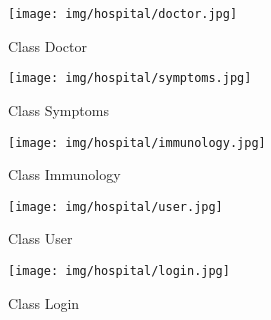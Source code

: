 \begin{figure}[!h]
\centering
\texttt{[image: img/hospital/doctor.jpg]}
\caption{Class Doctor}
\label{fig:hospitalDoctor}
\end{figure}




\begin{figure}[!h]
\centering
\texttt{[image: img/hospital/symptoms.jpg]}
\caption{Class Symptoms}
\label{fig:hospitalSymptoms}
\end{figure}




\begin{figure}[!h]
\centering
\texttt{[image: img/hospital/immunology.jpg]}
\caption{Class Immunology}
\label{fig:hospitalImmunology}
\end{figure}




\begin{figure}[!h]
\centering
\texttt{[image: img/hospital/user.jpg]}
\caption{Class User}
\label{fig:hospitalUser}
\end{figure}




\begin{figure}[!h]
\centering
\texttt{[image: img/hospital/login.jpg]}
\caption{Class Login}
\label{fig:hospitalLogin}
\end{figure}



